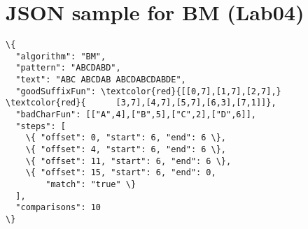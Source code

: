 \documentclass[jou]{apa6}
\begin{document}
\section{JSON sample for BM (Lab04)}


\begin{Verbatim}[commandchars=\\\{\}]
\{
  "algorithm": "BM",
  "pattern": "ABCDABD",
  "text": "ABC ABCDAB ABCDABCDABDE",
  "goodSuffixFun": \textcolor{red}{[[0,7],[1,7],[2,7],}
\textcolor{red}{      [3,7],[4,7],[5,7],[6,3],[7,1]]},
  "badCharFun": [["A",4],["B",5],["C",2],["D",6]],	
  "steps": [ 
    \{ "offset": 0, "start": 6, "end": 6 \},
    \{ "offset": 4, "start": 6, "end": 6 \},
    \{ "offset": 11, "start": 6, "end": 6 \},
    \{ "offset": 15, "start": 6, "end": 0, 
        "match": "true" \}    
  ],
  "comparisons": 10
\}
\end{Verbatim}
\end{document}
